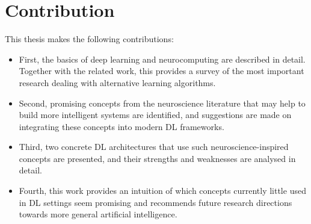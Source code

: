 



\section{Contribution}
This thesis makes the following contributions:
\begin{itemize}
	\item First, the basics of deep learning and neurocomputing are described in detail. Together with the related work, this provides a survey of the most important research dealing with alternative learning algorithms.
	\item Second, promising concepts from the neuroscience literature that may help to build more intelligent systems are identified, and suggestions are made on integrating these concepts into modern DL frameworks.
	\item Third, two concrete DL architectures that use such neuroscience-inspired concepts are presented, and their strengths and weaknesses are analysed in detail.
	\item Fourth, this work provides an intuition of which concepts currently little used in DL settings seem promising and recommends future research directions towards more general artificial intelligence.
\end{itemize}


